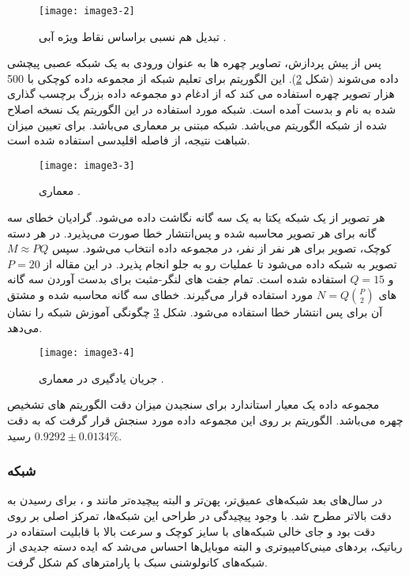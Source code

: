 \begin{figure}[h]
	\centering
	\texttt{[image: image3-2]}
	\caption{
		تبدیل هم نسبی  براساس نقاط ویژه آبی  
		\cite{amos2016openface}.}
	\label{image3-2}
\end{figure}

\noindent‏ 
پس از پیش پردازش، تصاویر چهره ها به عنوان ورودی به یک شبکه عصبی پیچشی داده می‌شوند (شکل \ref{image3-3}). این الگوریتم برای تعلیم شبکه از مجموعه داده کوچکی با 500 هزار تصویر چهره استفاده می کند که از ادغام دو مجموعه داده بزرگ برچسب گذاری شده به نام  و  بدست آمده است. شبکه مورد استفاده در این الگوریتم یک نسخه اصلاح شده از شبکه  الگوریتم  می‌باشد. شبکه  مبتنی بر معماری  می‌باشد. برای تعیین میزان شباهت نتیجه، از فاصله اقلیدسی استفاده شده است.
\begin{figure}[h]
	\centering
	\texttt{[image: image3-3]}
	\caption{معماری   \cite{amos2016openface}.}
	\label{image3-3}
\end{figure}

\noindent
هر تصویر از یک شبکه یکتا به یک سه گانه نگاشت داده می‌شود. گرادیان خطای سه گانه برای هر تصویر محاسبه شده و پس‌انتشار خطا صورت می‌پذیرد. در هر دسته کوچک،  تصویر برای هر نفر از  نفر، در مجموعه داده انتخاب می‌شود. سپس $M \approx PQ$ تصویر به شبکه داده می‌شود تا عملیات رو به جلو  انجام پذیرد. در این مقاله از $P=20$ و $Q=15$ استفاده شده است. تمام جفت های لنگر-مثبت برای بدست آوردن سه گانه های $N = Q \binom{P}{2}$ مورد استفاده قرار می‌گیرند. خطای سه گانه محاسبه شده و مشتق آن برای پس انتشار خطا استفاده می‌شود. شکل \ref{image3-4} چگونگی آموزش شبکه را نشان می‌دهد.

\begin{figure}[h]
	\centering
	\texttt{[image: image3-4]}
	\caption{جریان یادگیری در معماری  \cite{amos2016openface}.}
	\label{image3-4}
\end{figure}

\noindent
مجموعه داده  یک معیار استاندارد برای سنجیدن میزان دقت الگوریتم های تشخیص چهره می‌باشد. الگوریتم  بر روی این مجموعه داده مورد سنجش قرار گرفت که به دقت
$0.9292 \pm 0.0134 \%$ 
رسید.

\subsubsection{	شبکه }
در سال‌های بعد شبکه‌های عمیق‌تر، پهن‌تر و البته پیچیده‌تر مانند   و ،  برای رسیدن به دقت بالاتر مطرح شد. با وجود پیچیدگی در طراحی این شبکه‌ها، تمرکز اصلی ‌بر روی دقت بود و جای خالی شبکه‌های با سایز کوچک و سرعت بالا با قابلیت استفاده در رباتیک، بردهای مینی‌کامپیوتری و البته موبایل‌ها احساس می‌شد که ایده دسته جدیدی از شبکه‌های کانولوشنی سبک با پارامترهای کم‌ شکل گرفت. 

